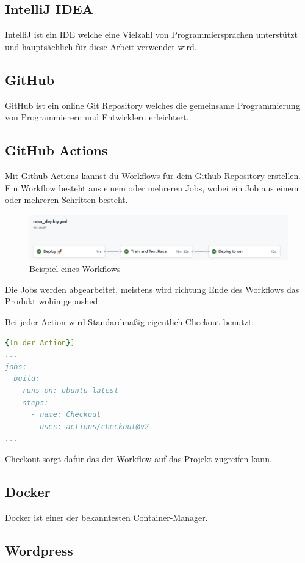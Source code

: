 \subsection{IntelliJ IDEA}
IntelliJ ist ein IDE welche eine Vielzahl von Programmiersprachen unterstützt und hauptsächlich für diese Arbeit verwendet wird.

\subsection{GitHub}
GitHub ist ein online Git Repository welches die gemeinsame Programmierung von Programmierern und Entwicklern erleichtert.

\subsection{GitHub Actions}\label{subsec:github-actions}
Mit Github Actions kannst du Workflows für dein Github Repository erstellen.
Ein Workflow besteht aus einem oder mehreren Jobs, wobei ein Job aus einem oder mehreren Schritten besteht.

\begin{figure}[hbt!]
    \centering
    \includegraphics[scale=0.5]{pics/ghActions}
    \caption{Beispiel eines Workflows}
    \label{fig:impl:ghActions}
\end{figure}

Die Jobs werden abgearbeitet, meistens wird richtung Ende des Workflows das Produkt wohin gepushed.

Bei jeder Action wird Standardmäßig eigentlich Checkout benutzt:

\begin{lstlisting}[language=yaml,label={lst:checkout},caption={In der Action}]{In der Action}]
...
jobs:
  build:
    runs-on: ubuntu-latest
    steps:
      - name: Checkout
        uses: actions/checkout@v2
...
\end{lstlisting}

Checkout sorgt dafür das der Workflow auf das Projekt zugreifen kann.
\subsection{Docker}
Docker ist einer der bekanntesten Container-Manager.

\subsection{Wordpress}

